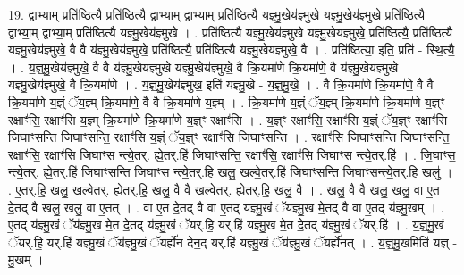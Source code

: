 \documentclass[17pt]{extarticle}
\begin{document}
19. द्वाभ्या॒म् प्रति॑ष्ठित्यै॒ प्रति॑ष्ठित्यै॒ द्वाभ्या॒म् द्वाभ्या॒म् प्रति॑ष्ठित्यै यज्ञ्मु॒खेय॑ज्ञ्मुखे यज्ञ्मु॒खेय॑ज्ञ्मुखे॒ प्रति॑ष्ठित्यै॒ द्वाभ्या॒म् द्वाभ्या॒म् प्रति॑ष्ठित्यै यज्ञ्मु॒खेय॑ज्ञ्मुखे । . प्रति॑ष्ठित्यै यज्ञ्मु॒खेय॑ज्ञ्मुखे यज्ञ्मु॒खेय॑ज्ञ्मुखे॒ प्रति॑ष्ठित्यै॒ प्रति॑ष्ठित्यै यज्ञ्मु॒खेय॑ज्ञ्मुखे॒ वै वै य॑ज्ञ्मु॒खेय॑ज्ञ्मुखे॒ प्रति॑ष्ठित्यै॒ प्रति॑ष्ठित्यै यज्ञ्मु॒खेय॑ज्ञ्मुखे॒ वै । . प्रति॑ष्ठित्या॒ इति॒ प्रति॑ - स्थि॒त्यै॒ । . य॒ज्ञ्॒मु॒खेय॑ज्ञ्मुखे॒ वै वै य॑ज्ञ्मु॒खेय॑ज्ञ्मुखे यज्ञ्मु॒खेय॑ज्ञ्मुखे॒ वै क्रि॒यमा॑णे क्रि॒यमा॑णे॒ वै य॑ज्ञ्मु॒खेय॑ज्ञ्मुखे यज्ञ्मु॒खेय॑ज्ञ्मुखे॒ वै क्रि॒यमा॑णे । . य॒ज्ञ्॒मु॒खेय॑ज्ञ्मुख॒ इति॑ यज्ञ्मु॒खे - य॒ज्ञ्॒मु॒खे॒ । . वै क्रि॒यमा॑णे क्रि॒यमा॑णे॒ वै वै क्रि॒यमा॑णे य॒ज्ञ्ं ॅय॒ज्ञ्म् क्रि॒यमा॑णे॒ वै वै क्रि॒यमा॑णे य॒ज्ञ्म् । . क्रि॒यमा॑णे य॒ज्ञ्ं ॅय॒ज्ञ्म् क्रि॒यमा॑णे क्रि॒यमा॑णे य॒ज्ञ्ꣳ रक्षाꣳ॑सि॒ रक्षाꣳ॑सि य॒ज्ञ्म् क्रि॒यमा॑णे क्रि॒यमा॑णे य॒ज्ञ्ꣳ रक्षाꣳ॑सि । . य॒ज्ञ्ꣳ रक्षाꣳ॑सि॒ रक्षाꣳ॑सि य॒ज्ञ्ं ॅय॒ज्ञ्ꣳ रक्षाꣳ॑सि जिघाꣳसन्ति जिघाꣳसन्ति॒ रक्षाꣳ॑सि य॒ज्ञ्ं ॅय॒ज्ञ्ꣳ रक्षाꣳ॑सि जिघाꣳसन्ति । . रक्षाꣳ॑सि जिघाꣳसन्ति जिघाꣳसन्ति॒ रक्षाꣳ॑सि॒ रक्षाꣳ॑सि जिघाꣳस न्त्ये॒तर्. ह्ये॒तर्.हि॑ जिघाꣳसन्ति॒ रक्षाꣳ॑सि॒ रक्षाꣳ॑सि जिघाꣳस न्त्ये॒तर्.हि॑ । . जि॒घाꣳ॒॒स॒ न्त्ये॒तर्. ह्ये॒तर्.हि॑ जिघाꣳसन्ति जिघाꣳस न्त्ये॒तर्.हि॒ खलु॒ खल्वे॒तर्.हि॑ जिघाꣳसन्ति जिघाꣳसन्त्ये॒तर्.हि॒ खलु॑ । . ए॒तर्.हि॒ खलु॒ खल्वे॒तर्. ह्ये॒तर्.हि॒ खलु॒ वै वै खल्वे॒तर्. ह्ये॒तर्.हि॒ खलु॒ वै । . खलु॒ वै वै खलु॒ खलु॒ वा ए॒त दे॒तद् वै खलु॒ खलु॒ वा ए॒तत् । . वा ए॒त दे॒तद् वै वा ए॒तद् य॑ज्ञ्मु॒खं ॅय॑ज्ञ्मु॒ख मे॒तद् वै वा ए॒तद् य॑ज्ञ्मु॒खम् । . ए॒तद् य॑ज्ञ्मु॒खं ॅय॑ज्ञ्मु॒ख मे॒त दे॒तद् य॑ज्ञ्मु॒खं ॅयर्.हि॒ यर्.हि॑ यज्ञ्मु॒ख मे॒त दे॒तद् य॑ज्ञ्मु॒खं ॅयर्.हि॑ । . य॒ज्ञ्॒मु॒खं ॅयर्.हि॒ यर्.हि॑ यज्ञ्मु॒खं ॅय॑ज्ञ्मु॒खं ॅयर्ह्ये॑न देन॒द् यर्.हि॑ यज्ञ्मु॒खं ॅय॑ज्ञ्मु॒खं ॅयर्ह्ये॑नत् । . य॒ज्ञ्॒मु॒खमिति॑ यज्ञ् - मु॒खम् । \newline
\end{document}
